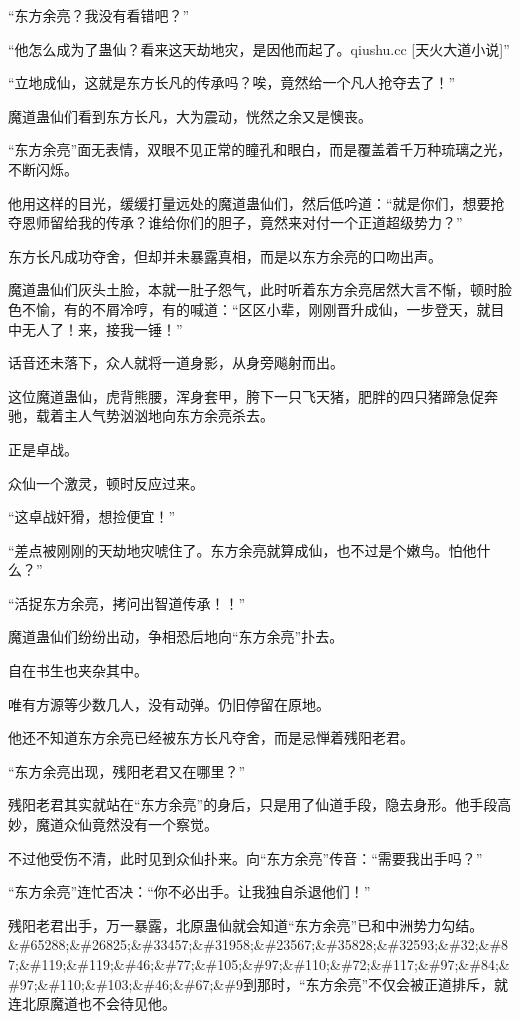 
\begin{this_body}

“东方余亮？我没有看错吧？”

“他怎么成为了蛊仙？看来这天劫地灾，是因他而起了。qiushu.cc [天火大道小说]”

“立地成仙，这就是东方长凡的传承吗？唉，竟然给一个凡人抢夺去了！”

魔道蛊仙们看到东方长凡，大为震动，恍然之余又是懊丧。

“东方余亮”面无表情，双眼不见正常的瞳孔和眼白，而是覆盖着千万种琉璃之光，不断闪烁。

他用这样的目光，缓缓打量远处的魔道蛊仙们，然后低吟道：“就是你们，想要抢夺恩师留给我的传承？谁给你们的胆子，竟然来对付一个正道超级势力？”

东方长凡成功夺舍，但却并未暴露真相，而是以东方余亮的口吻出声。

魔道蛊仙们灰头土脸，本就一肚子怨气，此时听着东方余亮居然大言不惭，顿时脸色不愉，有的不屑冷哼，有的喊道：“区区小辈，刚刚晋升成仙，一步登天，就目中无人了！来，接我一锤！”

话音还未落下，众人就将一道身影，从身旁飚射而出。

这位魔道蛊仙，虎背熊腰，浑身套甲，胯下一只飞天猪，肥胖的四只猪蹄急促奔驰，载着主人气势汹汹地向东方余亮杀去。

正是卓战。

众仙一个激灵，顿时反应过来。

“这卓战奸猾，想捡便宜！”

“差点被刚刚的天劫地灾唬住了。东方余亮就算成仙，也不过是个嫩鸟。怕他什么？”

“活捉东方余亮，拷问出智道传承！！”

魔道蛊仙们纷纷出动，争相恐后地向“东方余亮”扑去。

自在书生也夹杂其中。

唯有方源等少数几人，没有动弹。仍旧停留在原地。

他还不知道东方余亮已经被东方长凡夺舍，而是忌惮着残阳老君。

“东方余亮出现，残阳老君又在哪里？”

残阳老君其实就站在“东方余亮”的身后，只是用了仙道手段，隐去身形。他手段高妙，魔道众仙竟然没有一个察觉。

不过他受伤不清，此时见到众仙扑来。向“东方余亮”传音：“需要我出手吗？”

“东方余亮”连忙否决：“你不必出手。让我独自杀退他们！”

残阳老君出手，万一暴露，北原蛊仙就会知道“东方余亮”已和中洲势力勾结。\&\#65288;\&\#26825;\&\#33457;\&\#31958;\&\#23567;\&\#35828;\&\#32593;\&\#32;\&\#87;\&\#119;\&\#119;\&\#46;\&\#77;\&\#105;\&\#97;\&\#110;\&\#72;\&\#117;\&\#97;\&\#84;\&\#97;\&\#110;\&\#103;\&\#46;\&\#67;\&\#9到那时，“东方余亮”不仅会被正道排斥，就连北原魔道也不会待见他。


\end{this_body}
